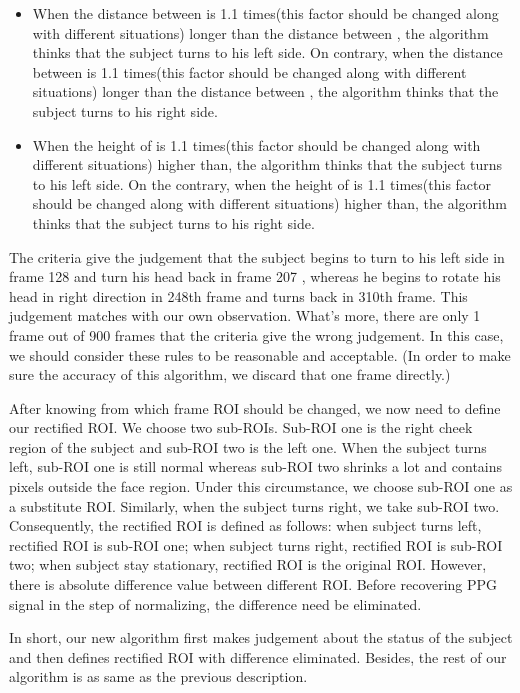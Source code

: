 \begin{itemize}
    \item When the distance between is 1.1 times(this factor should be changed along with different situations) longer than the distance between , the algorithm thinks that the subject turns to his left side. On contrary, when the distance between is 1.1 times(this factor should be changed along with different situations) longer than the distance between , the algorithm thinks that the subject turns to his right side.
    \item When the height of is 1.1 times(this factor should be changed along with different situations) higher than, the algorithm thinks that the subject turns to his left side. On the contrary, when the height of is 1.1 times(this factor should be changed along with different situations) higher than, the algorithm thinks that the subject turns to his right side.
\end{itemize} 

 The criteria give the judgement that the subject begins to turn to his left side in frame 128 and turn his head back in frame 207 , whereas he begins to rotate his head in right direction in 248th frame and turns back in 310th frame. This judgement matches with our own observation. What's more, there are only 1 frame out of 900 frames that the criteria give the wrong judgement. In this case, we should consider these rules to be reasonable and acceptable. (In order to make sure the accuracy of this algorithm, we discard that one frame directly.)

 After knowing from which frame ROI should be changed, we now need to define our rectified ROI. We choose two sub-ROIs. Sub-ROI one is the right cheek region of the subject and sub-ROI two is the left one. When the subject turns left, sub-ROI one is still normal whereas sub-ROI two shrinks a lot and contains pixels outside the face region. Under this circumstance, we choose sub-ROI one as a substitute ROI. Similarly, when the subject turns right, we take sub-ROI two. Consequently, the rectified ROI is defined as follows: when subject turns left, rectified ROI is sub-ROI one; when subject turns right, rectified ROI is sub-ROI two; when subject stay stationary, rectified ROI is the original ROI. However, there is absolute difference value between different ROI. Before recovering PPG signal in the step of normalizing, the difference need be eliminated. 

 In short, our new algorithm first makes judgement about the status of the subject and then defines rectified ROI with difference eliminated. Besides, the rest of our algorithm is as same as the previous description. 


